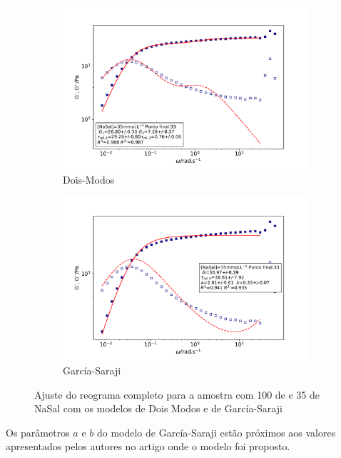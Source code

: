 	\begin{figure}[h]
		\begin{subfigure}{0.5\textwidth}
			\centering
			\includegraphics[width=\textwidth]{imagens/reologia/ajuste_TM_35}
			\caption{Dois-Modos}
			\label{fig:ajuste_tm_35}
		\end{subfigure} %
		\begin{subfigure}{0.5\textwidth}
			\centering
			\includegraphics[width=\textwidth]{imagens/reologia/ajuste_GS_35}
			\caption{García-Saraji}
			\label{fig:ajuste_gs_35}
		\end{subfigure}
		\caption{Ajuste do reograma completo para a amostra com 100 \mM{} de \CTAB{} e 35 \mM{} de NaSal com os modelos de Dois Modos e de García-Saraji}
		\label{fig:ajuste_gs_tm_35}
	\end{figure}
	
	Os parâmetros \(a\) e \(b\) do modelo de García-Saraji estão próximos aos valores apresentados pelos autores no artigo onde o modelo foi proposto. %
	
